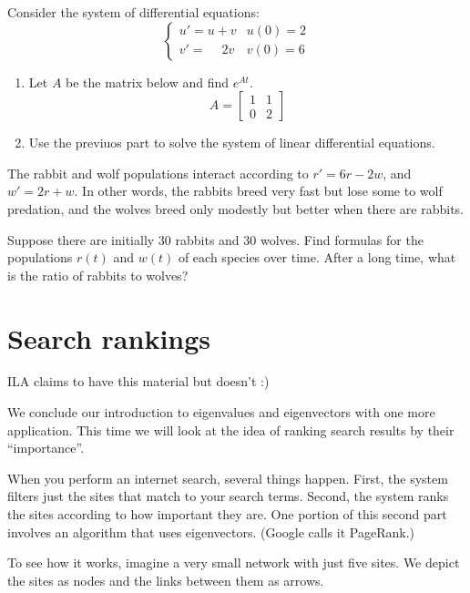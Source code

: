 \documentclass[11pt,oneside]{amsbook}
\theoremstyle{definition}
\theoremstyle{plain}
\theoremstyle{definition}
\theoremstyle{remark}
\numberwithin{equation}{section}
\numberwithin{figure}{section}
\newcounter{activityitem}
\newenvironment{activity}{\begin{list}{\arabic{activityitem}.}{\usecounter{activityitem}\setlength{\itemsep}{.2in}}}{\end{list}}
\begin{document}
\begin{activity}
  \item Consider the system of differential equations:
  \[\begin{cases}
      u'=u+v & u(0)=2\\
      v'=\quad\ 2v & v(0)=6
    \end{cases}
  \]
  \begin{enumerate}
    \item Let $A$ be the matrix below and find $e^{At}$.
    \[A=\begin{bmatrix}1&1\\0&2\end{bmatrix}
    \]
    \item Use the previuos part to solve the system of linear differential equations.
  \end{enumerate}
  \item The rabbit and wolf populations interact according to $r'=6r-2w$, and $w'=2r+w$. In other words, the rabbits breed very fast but lose some to wolf predation, and the wolves breed only modestly but better when there are rabbits.

  Suppose there are initially 30 rabbits and 30 wolves. Find formulas for the populations $r(t)$ and $w(t)$ of each species over time. After a long time, what is the ratio of rabbits to wolves?
\end{activity}


\newpage
\section{Search rankings}

ILA claims to have this material but doesn't :)

We conclude our introduction to eigenvalues and eigenvectors with one more application. This time we will look at the idea of ranking search results by their ``importance''.

When you perform an internet search, several things happen. First, the system filters just the sites that match to your search terms. Second, the system ranks the sites according to how important they are. One portion of this second part involves an algorithm that uses eigenvectors. (Google calls it PageRank.)

To see how it works, imagine a very small network with just five sites. We depict the sites as nodes and the links between them as arrows.
\begin{center}
\end{center}
\end{document}
